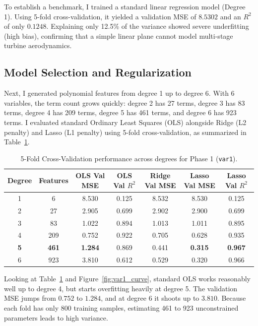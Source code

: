 \documentclass[11pt,a4paper]{article}
\begin{document}
To establish a benchmark, I trained a standard linear regression model (Degree 1). Using 5-fold cross-validation, it yielded a validation MSE of $8.5302$ and an $R^2$ of only $0.1248$. Explaining only 12.5\% of the variance showed severe underfitting (high bias), confirming that a simple linear plane cannot model multi-stage turbine aerodynamics.

\subsection{Model Selection and Regularization}
Next, I generated polynomial features from degree 1 up to degree 6. With 6 variables, the term count grows quickly: degree 2 has 27 terms, degree 3 has 83 terms, degree 4 has 209 terms, degree 5 has 461 terms, and degree 6 has 923 terms. I evaluated standard Ordinary Least Squares (OLS) alongside Ridge (L2 penalty) and Lasso (L1 penalty) using 5-fold cross-validation, as summarized in Table~\ref{tab:var1}.

\begin{table}[htbp]
\centering
\small
\setlength{\tabcolsep}{5pt}
\caption{5-Fold Cross-Validation performance across degrees for Phase 1 (\texttt{var1}).}
\label{tab:var1}
\begin{tabular}{ccccccc}
\toprule
Degree & Features & OLS Val MSE & OLS Val $R^2$ & Ridge Val MSE & Lasso Val MSE & Lasso Val $R^2$ \\
\midrule
1 & 6   & 8.530 & 0.125 & 8.532 & 8.530 & 0.125 \\
2 & 27  & 2.905 & 0.699 & 2.902 & 2.900 & 0.699 \\
3 & 83  & 1.022 & 0.894 & 1.013 & 1.011 & 0.895 \\
4 & 209 & 0.752 & 0.922 & 0.705 & 0.628 & 0.935 \\
\textbf{5} & \textbf{461} & \textbf{1.284} & 0.869 & 0.441 & \textbf{0.315} & \textbf{0.967} \\
6 & 923 & 3.810 & 0.612 & 0.529 & 0.320 & 0.966 \\
\bottomrule
\end{tabular}
\end{table}

Looking at Table~\ref{tab:var1} and Figure~\ref{fig:var1_curve}, standard OLS works reasonably well up to degree 4, but starts overfitting heavily at degree 5. The validation MSE jumps from $0.752$ to $1.284$, and at degree 6 it shoots up to $3.810$. Because each fold has only 800 training samples, estimating 461 to 923 unconstrained parameters leads to high variance.
\end{document}
